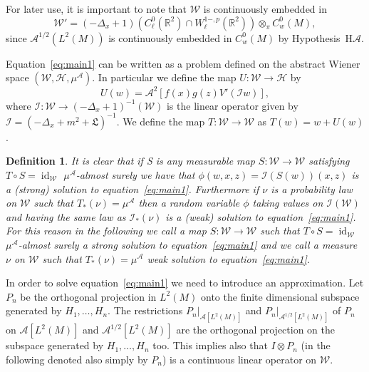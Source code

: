 \documentclass[a4paper,10pt]{article}
\newcommand{\asterisk}{\mathord{*}}
\newcommand{\nobracket}{}
\newcommand{\tmem}[1]{{\em #1\/}}
\newcommand{\tmop}[1]{\ensuremath{\operatorname{#1}}}
\newcommand{\tmtextit}[1]{{\itshape{#1}}}
\newtheorem{definition}{Definition}
\begin{document}
For later use, it is important to note that $\mathcal{W}$ is continuously
embedded in
\[ \mathcal{W}' = (- \Delta_x + 1) (C^0_{\ell} (\mathbb{R}^2) \cap W^{1 -,
   p}_{\ell} (\mathbb{R}^2)) \otimes_{\pi} C^0_w (M), \]
since $\mathcal{A}^{1 / 2} (L^2 (M))$ is continuously embedded in $C^0_w (M)$
by Hypothesis~H$\mathcal{A}$.



Equation~{\eqref{eq:main1}} can be written as a problem defined on the
abstract Wiener space $(\mathcal{W}, \mathcal{H}, \mu^{\mathcal{A}})$. In
particular we define the map $U : \mathcal{W} \rightarrow \mathcal{H}$ by
\[ U (w) = \mathcal{A}^2 [f (x) g (z) V' (\mathcal{I} w)], \]
where $\mathcal{I} : \mathcal{W} \rightarrow (- \Delta_x + 1)^{- 1}
(\mathcal{W})$ is the linear operator given by $\mathcal{I} = (- \Delta_x +
m^2 + \mathfrak{L})^{- 1}$. We define the map $T : \mathcal{W} \rightarrow
\mathcal{W}$ as $T (w) = w + U (w)$.

\begin{definition}
  \label{definition1}It is clear that if S is any measurable map $S :
  \mathcal{W} \rightarrow \mathcal{W}$ satisfying $T \circ S =
  \tmop{id}_{\mathcal{W}}$ $\mu^{\mathcal{A}}$-almost surely we have that
  $\phi (w, x, z) = \mathcal{I} (S (w)) (x, z)$ is a (strong) solution to
  equation~{\eqref{eq:main1}}. Furthermore if $\nu$ is a probability law on
  $\mathcal{W}$ such that $T_{\asterisk} (\nu) = \mu^{\mathcal{A}}$ then a
  random variable $\phi$ taking values on $\mathcal{} \mathcal{I}
  (\mathcal{W})$ and having the same law as $\mathcal{I}_{\asterisk} (\nu)$ is
  a (weak) solution to equation~{\eqref{eq:main1}}. For this reason in the
  following we call a map $S : \mathcal{W} \rightarrow \mathcal{W}$ such that
  $T \circ S = \tmop{id}_{\mathcal{W}}$ $\mu^{\mathcal{A}}$-almost surely
  {\tmem{a strong solution to equation~{\eqref{eq:main1}}}} and we call a
  measure $\nu$ on $\mathcal{W}$ such that $T_{\asterisk} (\nu) =
  \mu^{\mathcal{A}}$ \tmtextit{{\tmem{weak solution to
  equation~{\eqref{eq:main1}}}}}.
\end{definition}

In order to solve equation~{\eqref{eq:main1}} we need to introduce an
approximation. Let $P_n$ be the orthogonal projection in $L^2 (M)$ onto the
finite dimensional subspace generated by $H_1, \ldots, H_n$. The restrictions
$\nobracket P_n |_{\mathcal{A} [L^2 (M)]}$ and $\nobracket P_n
|_{\mathcal{A}^{1 / 2} [L^2 (M)]}$ of $P_n$ on $\mathcal{A} [L^2 (M)]$ and
$\mathcal{A}^{1 / 2} [L^2 (M)]$ are the orthogonal projection on the subspace
generated by $H_1, \ldots, H_n$ too. This implies also that $I \otimes P_n$
(in the following denoted also simply by $P_n$) is a continuous linear
operator on $\mathcal{W}$.
\end{document}
